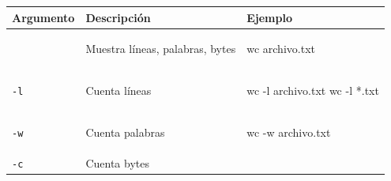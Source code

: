 \documentclass[
  spanish,
  12pt,
  letterpaper,
  DIV=11,
  numbers=noendperiod]{scrreprt}
\newenvironment{Shaded}{\begin{snugshade}}{\end{snugshade}}
\newcommand{\AttributeTok}[1]{\textcolor[rgb]{0.40,0.45,0.13}{#1}}
\newcommand{\FunctionTok}[1]{\textcolor[rgb]{0.28,0.35,0.67}{#1}}
\newcommand{\NormalTok}[1]{\textcolor[rgb]{0.00,0.23,0.31}{#1}}
\newcommand{\PreprocessorTok}[1]{\textcolor[rgb]{0.68,0.00,0.00}{#1}}
\newcounter{none} %
\begin{document}
{\def\LTcaptype{none} %
\begin{longtable}[]{@{}
  >{\raggedright\arraybackslash}p{}
  >{\raggedright\arraybackslash}p{}
  >{\raggedright\arraybackslash}p{}@{}}
\toprule\noalign{}
\begin{minipage}[b]{\linewidth}\raggedright
Argumento
\end{minipage} & \begin{minipage}[b]{\linewidth}\raggedright
Descripción
\end{minipage} & \begin{minipage}[b]{\linewidth}\raggedright
Ejemplo
\end{minipage} \\
\midrule\noalign{}
\endhead
\bottomrule\noalign{}
\endlastfoot
& Muestra líneas, palabras, bytes &
\begin{minipage}[t]{\linewidth}\raggedright
\begin{Shaded}
\begin{Highlighting}[]
\FunctionTok{wc}\NormalTok{ archivo.txt}
\end{Highlighting}
\end{Shaded}
\end{minipage} \\
\texttt{-l} & Cuenta líneas &
\begin{minipage}[t]{\linewidth}\raggedright
\begin{Shaded}
\begin{Highlighting}[]
\FunctionTok{wc} \AttributeTok{{-}l}\NormalTok{ archivo.txt}
\FunctionTok{wc} \AttributeTok{{-}l} \PreprocessorTok{*}\NormalTok{.txt}
\end{Highlighting}
\end{Shaded}
\end{minipage} \\
\texttt{-w} & Cuenta palabras &
\begin{minipage}[t]{\linewidth}\raggedright
\begin{Shaded}
\begin{Highlighting}[]
\FunctionTok{wc} \AttributeTok{{-}w}\NormalTok{ archivo.txt}
\end{Highlighting}
\end{Shaded}
\end{minipage} \\
\texttt{-c} & Cuenta bytes & \begin{minipage}[t]{\linewidth}\raggedright

\end{minipage}
\end{longtable}}
\end{document}
